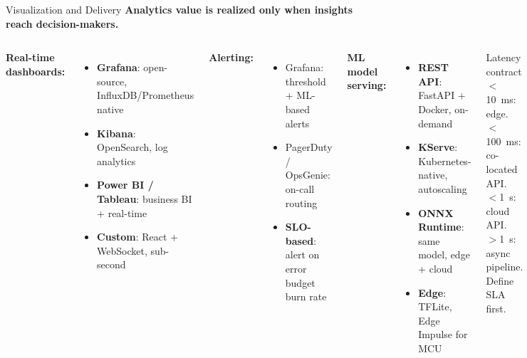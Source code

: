 \documentclass[aspectratio=169,11pt]{beamer}
\begin{document}
\begin{frame}{Visualization and Delivery}
    \small
    \textbf{Analytics value is realized only when insights reach decision-makers.}

    \vspace{0.05cm}
    \begin{columns}
        \textbf{Real-time dashboards:}
        \begin{itemize}\setlength{\itemsep}{0pt}
            \item \textbf{Grafana}: open-source, InfluxDB/Prometheus native
            \item \textbf{Kibana}: OpenSearch, log analytics
            \item \textbf{Power BI / Tableau}: business BI + real-time
            \item \textbf{Custom}: React + WebSocket, sub-second
        \end{itemize}

        \vspace{0.05cm}
        \textbf{Alerting:}
        \begin{itemize}\setlength{\itemsep}{0pt}
            \item Grafana: threshold + ML-based alerts
            \item PagerDuty / OpsGenie: on-call routing
            \item \textbf{SLO-based}: alert on error budget burn rate
        \end{itemize}

        \textbf{ML model serving:}
        \begin{itemize}\setlength{\itemsep}{0pt}
            \item \textbf{REST API}: FastAPI + Docker, on-demand
            \item \textbf{KServe}: Kubernetes-native, autoscaling
            \item \textbf{ONNX Runtime}: same model, edge + cloud
            \item \textbf{Edge}: TFLite, Edge Impulse for MCU
        \end{itemize}

        \vspace{0.05cm}
        \begin{alertblock}{Latency contract}
            $<$10~ms: edge. $<$100~ms: co-located API. $<$1~s: cloud API. $>$1~s: async pipeline. Define SLA first.
        \end{alertblock}
    \end{columns}
\end{frame}
\end{document}
